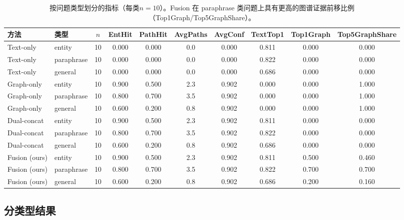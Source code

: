 \begin{table}[t]
  \centering
  \caption{按问题类型划分的指标（每类$n=10$）。Fusion 在 paraphrase 类问题上具有更高的图谱证据前移比例（Top1Graph/Top5GraphShare）。}
  \label{tab:qa_metrics_by_type}
  \begin{tabular}{l l S[table-format=2.0] S[table-format=1.3] S[table-format=1.3] S[table-format=1.1] S[table-format=1.3] S[table-format=1.3] S[table-format=1.3] S[table-format=1.3]}
    \toprule
    {方法} & {类型} & {$n$} & {EntHit} & {PathHit} & {AvgPaths} & {AvgConf} & {TextTop1} & {Top1Graph} & {Top5GraphShare} \\
    \midrule
    Text-only & entity     & 10 & 0.000 & 0.000 & 0.0 & 0.000 & 0.811 & 0.000 & 0.000 \\
    Text-only & paraphrase & 10 & 0.000 & 0.000 & 0.0 & 0.000 & 0.822 & 0.000 & 0.000 \\
    Text-only & general    & 10 & 0.000 & 0.000 & 0.0 & 0.000 & 0.686 & 0.000 & 0.000 \\
    \addlinespace
    Graph-only & entity     & 10 & 0.900 & 0.500 & 2.3 & 0.902 & 0.000 & 0.000 & 1.000 \\
    Graph-only & paraphrase & 10 & 0.800 & 0.700 & 3.5 & 0.902 & 0.000 & 0.000 & 1.000 \\
    Graph-only & general    & 10 & 0.600 & 0.200 & 0.8 & 0.902 & 0.000 & 0.000 & 1.000 \\
    \addlinespace
    Dual-concat & entity     & 10 & 0.900 & 0.500 & 2.3 & 0.902 & 0.811 & 0.000 & 0.000 \\
    Dual-concat & paraphrase & 10 & 0.800 & 0.700 & 3.5 & 0.902 & 0.822 & 0.000 & 0.000 \\
    Dual-concat & general    & 10 & 0.600 & 0.200 & 0.8 & 0.902 & 0.686 & 0.000 & 0.000 \\
    \addlinespace
    Fusion (ours) & entity     & 10 & 0.900 & 0.500 & 2.3 & 0.902 & 0.811 & 0.500 & 0.460 \\
    Fusion (ours) & paraphrase & 10 & 0.800 & 0.700 & 3.5 & 0.902 & 0.822 & 0.700 & 0.700 \\
    Fusion (ours) & general    & 10 & 0.600 & 0.200 & 0.8 & 0.902 & 0.686 & 0.200 & 0.160 \\
    \bottomrule
  \end{tabular}
\end{table}

\subsection{分类型结果}
\label{subsec:type_results}

